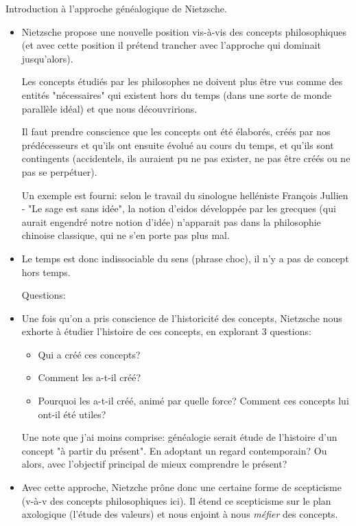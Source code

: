 \documentclass{report}
\theoremstyle{definition}
\begin{document}
Introduction à l'approche généalogique de Nietzsche.
\begin{itemize}
    \item Nietzsche propose une nouvelle position vis-à-vis des concepts philosophiques (et avec cette position il prétend trancher avec l'approche qui dominait jusqu'alors).

    Les concepts étudiés par les philosophes ne doivent plus être vus comme des entités "nécessaires" qui existent hors du temps (dans une sorte de monde parallèle idéal) et que nous découvririons.

    Il faut prendre conscience que les concepts ont été élaborés, créés par nos prédécesseurs et qu'ils ont ensuite évolué au cours du temps, et qu'ils sont contingents (accidentels, ils auraient pu ne pas exister, ne pas être créés ou ne pas se perpétuer).

    Un exemple est fourni: selon le travail du sinologue helléniste François Jullien - "Le sage est sans idée", la notion d'eidos développée par les grecques (qui aurait engendré notre notion d'idée) n'apparait pas dans la philosophie chinoise classique, qui ne s'en porte pas plus mal.
    \item Le temps est donc indissociable du sens (phrase choc), il n'y a pas de concept hors temps.

    Questions:
    \item Une fois qu'on a pris conscience de l'historicité des concepts, Nietzsche nous exhorte à étudier l'histoire de ces concepts, en explorant 3 questions:
    \begin{itemize}
        \item Qui a créé ces concepts?
        \item Comment les a-t-il créé?
        \item Pourquoi les a-t-il créé, animé par quelle force? Comment ces concepts lui ont-il été utiles?
    \end{itemize}

    Une note que j'ai moins comprise: généalogie serait étude de l'histoire d'un concept "à partir du présent". En adoptant un regard contemporain? Ou alors, avec l'objectif principal de mieux comprendre le présent?
    \item Avec cette approche, Nietzche prône donc une certaine forme de scepticisme (v-à-v des concepts philosophiques ici). Il étend ce scepticisme sur le plan axologique (l'étude des valeurs) et nous enjoint à nous \emph{méfier} des concepts.


\end{itemize}
\end{document}
